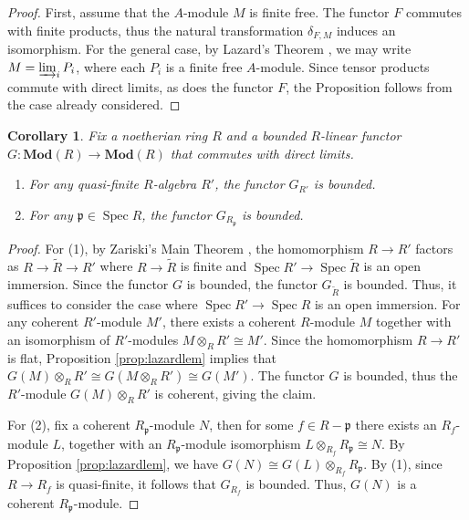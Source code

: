 \documentclass{amsart}
\theoremstyle{plain}
\newtheorem{cor}[thm]{Corollary}
\theoremstyle{definition}
\theoremstyle{remark}
\numberwithin{equation}{section}
\DeclareMathOperator{\spec}{Spec}
\newcommand{\MOD}[1]{\mathbf{Mod}({#1})}
\newcommand{\tensor}{\otimes}
\begin{document}
\begin{proof}
  First, assume that the $A$-module $M$ is finite free. The functor
  $F$ commutes with finite products, thus the natural transformation
  $\delta_{F,M}$ induces an isomorphism. For the general case, by
  Lazard's Theorem 
  \cite{MR0168625}, we may write $M = \varinjlim_i P_i$, where each
  $P_i$ is a finite free $A$-module. Since tensor products commute
  with direct limits, as does the functor $F$, the Proposition
  follows from the case already considered.  
\end{proof}
\begin{cor}\label{cor:qf_bdd}
  Fix a noetherian ring $R$ and a bounded $R$-linear functor $G :
  \MOD{R} \to \MOD{R}$ that commutes with direct limits. 
  \begin{enumerate}
  \item For any quasi-finite $R$-algebra $R'$, the functor $G_{R'}$ is
    bounded. 
  \item For any $\mathfrak{p} \in \spec R$, the functor
    $G_{R_{\mathfrak{p}}}$ is bounded.  
  \end{enumerate}
\end{cor}
\begin{proof}
  For (1), by Zariski's Main Theorem \cite[{IV}.18.12.13]{EGA}, the
  homomorphism $R \to R'$ factors as $R \to \widetilde{R} \to R'$ where $R
  \to \widetilde{R}$ is finite and $\spec {R'} \to \spec
  \widetilde{R}$ is an open 
  immersion. Since the functor $G$ is bounded, the
  functor $G_{\widetilde{R}}$ is bounded. Thus, it suffices to consider the 
  case where $\spec R' \to \spec R$ is an open immersion. For any coherent
  $R'$-module $M'$, there exists a coherent $R$-module $M$
  together with an isomorphism of $R'$-modules $M\tensor_R R' \cong
  M'$. Since the homomorphism $R \to R'$ is
  flat, Proposition \ref{prop:lazardlem} implies that $G(M)\tensor_R
  R' \cong G(M\tensor_R R') \cong G(M')$. The functor $G$ is
  bounded, thus the $R'$-module $G(M)\tensor_R R'$ is coherent, giving
  the claim.

  For (2), fix a coherent $R_{\mathfrak{p}}$-module $N$, then for
  some $f\in R-\mathfrak{p}$ there exists an $R_f$-module $L$, together
  with an $R_{\mathfrak{p}}$-module isomorphism $L\tensor_{R_f}
  R_{\mathfrak{p}} \cong N$. By Proposition \ref{prop:lazardlem}, we have
  $G(N)\cong G(L)\tensor_{R_f} R_{\mathfrak{p}}$. By (1), since $R \to
  R_f$ is quasi-finite, it follows that $G_{R_f}$ is bounded. Thus,
  $G(N)$ is a coherent $R_{\mathfrak{p}}$-module.
\end{proof}
\end{document}
